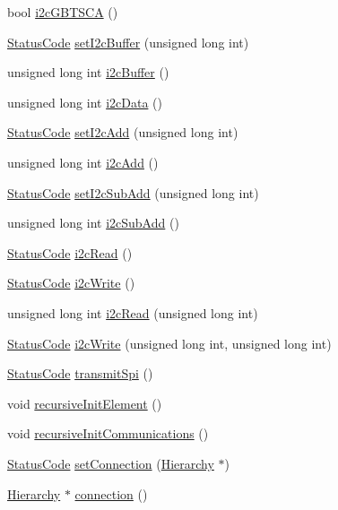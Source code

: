 \begin{DoxyCompactItemize}
bool \hyperlink{classSeqPGA_a1d9edf6e3303581efe0bdb1b8b3fff0c}{i2c\+G\+B\+T\+S\+CA} ()
\item 
\hyperlink{classStatusCode}{Status\+Code} \hyperlink{classSeqPGA_ab93beca49a31c1f9fddc915e9efeeaa0}{set\+I2c\+Buffer} (unsigned long int)
\item 
unsigned long int \hyperlink{classSeqPGA_a3d441522bfe5a6d35b8a77cbcd38b49e}{i2c\+Buffer} ()
\item 
unsigned long int \hyperlink{classSeqPGA_a5e48f7b7ca1ada5a1decc0436dda4b26}{i2c\+Data} ()
\item 
\hyperlink{classStatusCode}{Status\+Code} \hyperlink{classSeqPGA_a4ef334e4d2cb417b49033dce951728cd}{set\+I2c\+Add} (unsigned long int)
\item 
unsigned long int \hyperlink{classSeqPGA_a67022684977cb2f6335eb6b21262fe89}{i2c\+Add} ()
\item 
\hyperlink{classStatusCode}{Status\+Code} \hyperlink{classSeqPGA_a348c5d982223fb5cf2878e5bf3c6429c}{set\+I2c\+Sub\+Add} (unsigned long int)
\item 
unsigned long int \hyperlink{classSeqPGA_a6c7137f9b45a20ecfcccf1d47e5af985}{i2c\+Sub\+Add} ()
\item 
\hyperlink{classStatusCode}{Status\+Code} \hyperlink{classSeqPGA_a7cd344df2be99f3a02b487f80e87b27e}{i2c\+Read} ()
\item 
\hyperlink{classStatusCode}{Status\+Code} \hyperlink{classSeqPGA_a429076ca3a4ece94182bd95c623bb9d0}{i2c\+Write} ()
\item 
unsigned long int \hyperlink{classSeqPGA_a9cf54d57d77b04f54cc0fe516c3528b4}{i2c\+Read} (unsigned long int)
\item 
\hyperlink{classStatusCode}{Status\+Code} \hyperlink{classSeqPGA_a4176b2047888421f8766d038e35bccfd}{i2c\+Write} (unsigned long int, unsigned long int)
\item 
\hyperlink{classStatusCode}{Status\+Code} \hyperlink{classSeqPGA_a579b4ab222e1c4778640948fbf2a8805}{transmit\+Spi} ()
\item 
void \hyperlink{classElement_a3c0abcb36f8906688bb7e32608df7086}{recursive\+Init\+Element} ()
\item 
void \hyperlink{classElement_a82119ed37dff76508a2746a853ec35ba}{recursive\+Init\+Communications} ()
\item 
\hyperlink{classStatusCode}{Status\+Code} \hyperlink{classElement_ab476b4b1df5954141ceb14f072433b89}{set\+Connection} (\hyperlink{classHierarchy}{Hierarchy} $\ast$)
\item 
\hyperlink{classHierarchy}{Hierarchy} $\ast$ \hyperlink{classElement_af57444353c1ddf9fa0109801e97debf7}{connection} ()

\end{DoxyCompactItemize}
